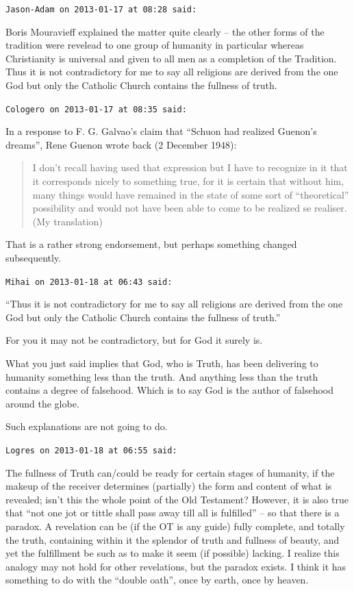 \begin{footnotesize}
\begin{sffamily}
\texttt{Jason-Adam on 2013-01-17 at 08:28 said:}

Boris Mouravieff explained the matter quite clearly -- the other forms of the tradition were revelead to one group of humanity in particular whereas Christianity is universal and given to all men as a completion of the Tradition. Thus it is not contradictory for me to say all religions are derived from the one God but only the Catholic Church contains the fullness of truth.

\hfill

\texttt{Cologero on 2013-01-17 at 08:35 said:}

In a response to F. G. Galvao's claim that ``Schuon had realized Guenon's dreams'', Rene Guenon wrote back (2 December 1948):

\begin{quote}\footnotesize

I don't recall having used that expression but I have to recognize in it that it corresponds nicely to something true, for it is certain that without him, many things would have remained in the state of some sort of ``theoretical'' possibility and would not have been able to come to be realized se realiser. (My translation)
\end{quote}  

That is a rather strong endorsement, but perhaps something changed subsequently.

\hfill

\texttt{Mihai on 2013-01-18 at 06:43 said:}

``Thus it is not contradictory for me to say all religions are derived from the one God but only the Catholic Church contains the fullness of truth.''

For you it may not be contradictory, but for God it surely is.

What you just said implies that God, who is Truth, has been delivering to humanity something less than the truth. And anything less than the truth contains a degree of falsehood. Which is to say God is the author of falsehood around the globe.

Such explanations are not going to do.

\hfill

\texttt{Logres on 2013-01-18 at 06:55 said:}

The fullness of Truth can/could be ready for certain stages of humanity, if the makeup of the receiver determines (partially) the form and content of what is revealed; isn't this the whole point of the Old Testament? However, it is also true that ``not one jot or tittle shall pass away till all is fulfilled'' -- so that there is a paradox. A revelation can be (if the OT is any guide) fully complete, and totally the truth, containing within it the splendor of truth and fullness of beauty, and yet the fulfillment be such as to make it seem (if possible) lacking. I realize this analogy may not hold for other revelations, but the paradox exists. I think it has something to do with the ``double oath'', once by earth, once by heaven.


\end{sffamily}
\end{footnotesize}
